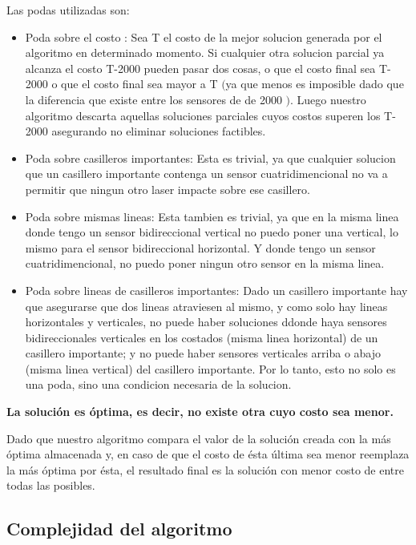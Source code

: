 Las podas utilizadas son:
\begin{itemize}
\item Poda sobre el costo : Sea T el costo de la mejor solucion generada por el algoritmo en determinado momento. Si cualquier otra solucion parcial ya alcanza el costo T-2000 pueden pasar dos cosas, o que el costo final sea T-2000 
o que el costo final sea mayor a T $($ya que menos es imposible dado que la diferencia que existe entre los sensores de de 2000 $)$. Luego nuestro algoritmo descarta aquellas soluciones parciales cuyos costos superen los T-2000
asegurando no eliminar soluciones factibles.  
\item Poda sobre casilleros importantes: Esta es trivial, ya que cualquier solucion que un casillero importante contenga un sensor cuatridimencional no va a permitir que ningun otro laser impacte sobre ese casillero.
\item Poda sobre mismas lineas: Esta tambien es trivial, ya que en la misma linea donde tengo un sensor bidireccional vertical no puedo poner una vertical, lo mismo para el sensor bidireccional horizontal. Y donde 
tengo un sensor cuatridimencional, no puedo poner ningun otro sensor en la misma linea.
\item Poda sobre lineas de casilleros importantes: Dado un casillero importante hay que asegurarse que dos lineas atraviesen al mismo, y como solo hay lineas horizontales y verticales, no puede haber soluciones
ddonde haya sensores bidireccionales verticales en los costados (misma linea horizontal) de un casillero importante; y no puede haber sensores verticales arriba o abajo (misma linea vertical) del casillero importante.
 Por lo tanto, esto no solo es una poda, sino una condicion necesaria de la solucion.
\end{itemize}

\textbf{La solución es óptima, es decir, no existe otra cuyo costo sea menor.} \newline

Dado que nuestro algoritmo compara el valor de la solución creada con la más óptima almacenada y, en caso de que el costo de ésta última sea menor reemplaza la más óptima por ésta, el resultado final es la solución con menor costo de entre todas las posibles.


\subsection{Complejidad del algoritmo}


